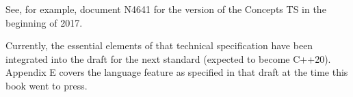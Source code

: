 \begin{tcolorbox}[colback=webgreen!5!white,colframe=webgreen!75!black]
\hspace*{0.75cm}See, for example, document N4641 for the version of the Concepts TS in the beginning of 2017.
\end{tcolorbox}

Currently, the essential elements of that technical specification have been integrated into the draft for the next standard (expected to become C++20). Appendix E covers the language feature as specified in that draft at the time this book went to press.














































